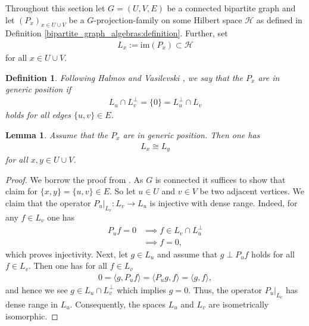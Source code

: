 \documentclass[a4paper]{amsart}
\newtheorem{definition}[thm]{Definition}
\newtheorem{lemma}[thm]{Lemma}
\begin{document}
Throughout this section let $G = (U, V, E)$ be a connected bipartite graph and let $(P_x)_{x \in U \cup V}$ be a $G$-projection-family on some Hilbert space $\mathcal{H}$ as defined in Definition \ref{bipartite_graph_algebras:definition}.
Further, set 
\begin{align*}
    L_x := \mathrm{im}(P_x) \subset \mathcal{H}
\end{align*}
for all $x \in U \cup V$.

\begin{definition}
    \label{genpos::def::generic_position}
    Following Halmos and Vasilevski \cite{halmos_two_1969, vasilevski_algebra_1981}, we say that the $P_x$ are in \emph{generic position} if
    \begin{align*}
        L_u \cap L_v^\perp = \{0\} = L_u^\perp \cap L_v
    \end{align*}
    holds for all edges $\{u, v\} \in E$.
\end{definition}

\begin{lemma} 
    \label{genpos::lemma::Lx_are_isomorphic}
    Assume that the $P_x$ are in generic position. Then one has 
    \begin{align*}
        L_x \cong L_y
    \end{align*}
    for all $x, y \in U \cup V$.
\end{lemma}

\begin{proof}
    We borrow the proof from \cite[Theorem 1]{halmos_two_1969}.
    As $G$ is connected it suffices to show that claim for $\{x, y\} = \{u, v\} \in E$. So let $u \in U$ and $v \in V$ be two adjacent vertices. We claim that the operator $P_u |_{L_v} : L_v \to L_u$ is injective with dense range. Indeed, for any $f \in L_v$ one has 
    \begin{align*}
        P_u f = 0
        &\implies f \in L_v \cap L_u^\perp  \\
        &\implies f = 0,
    \end{align*}
    which proves injectivity. Next, let $g \in L_u$ and assume that $g \perp P_u f$ holds for all $f \in L_v$. Then one has for all $f \in L_v$
    \begin{align*}
        0 = \langle g, P_u f \rangle = \langle P_u g, f \rangle = \langle g, f \rangle,
    \end{align*}
    and hence we see $g \in L_u \cap L_v^\perp$ which implies $g = 0$. Thus, the operator $P_u |_{L_v}$ has dense range in $L_u$. Consequently, the spaces $L_u$ and $L_v$ are isometrically isomorphic.
\end{proof}
\end{document}
